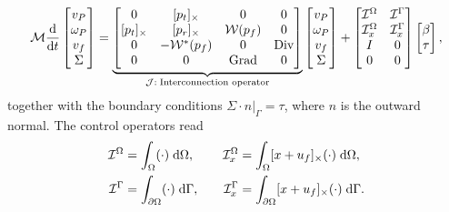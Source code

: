 \begin{equation}
\label{eq:ph_mfd}
\mathcal{M}
\diff{}{t}
\begin{bmatrix}
v_P \\ \omega_P  \\ v_f  \\ \Sigma \\
\end{bmatrix} = 
\underbrace{\begin{bmatrix}
0 & \crmat{p_t} & 0 & 0 \\
\crmat{p_t} & \crmat{p_r} & \mathcal{W}(p_f) & 0 \\
0 & -\mathcal{W}^*(p_f) & 0 & \Div \\
0 & 0 & \Grad & 0 \\
\end{bmatrix}}_{\mathcal{J}: \; \text{Interconnection operator}}
\begin{bmatrix}
v_P \\ \omega_P  \\ v_f  \\ \Sigma \\
\end{bmatrix} + 
\begin{bmatrix}
\mathcal{I}^\Omega & \mathcal{I}^\Gamma \\
\mathcal{I}_{x}^\Omega & \mathcal{I}_{x}^\Gamma \\
I & 0 \\
0 & 0 \\
\end{bmatrix}
\begin{bmatrix}
\beta \\ \tau \\
\end{bmatrix},
\end{equation}
together with the boundary conditions $\Sigma \cdot n|_{\Gamma} = \tau$, where $n$ is the outward normal. The control operators read
\begin{equation*}
\begin{aligned}
\mathcal{I}^\Omega &=\int_{\Omega} (\cdot) \d{\Omega}, \\
\mathcal{I}^\Gamma &= \int_{\partial \Omega} (\cdot) \d{\Gamma}, \\
\end{aligned} \qquad
\begin{aligned} 
\mathcal{I}_{x}^\Omega &=\int_{\Omega} \crmat{x+u_f} (\cdot) \d{\Omega}, \\
\mathcal{I}_{x}^\Gamma &=\int_{\partial \Omega} \crmat{x+u_f} (\cdot) \d{\Gamma}. \\
\end{aligned}
\end{equation*}
